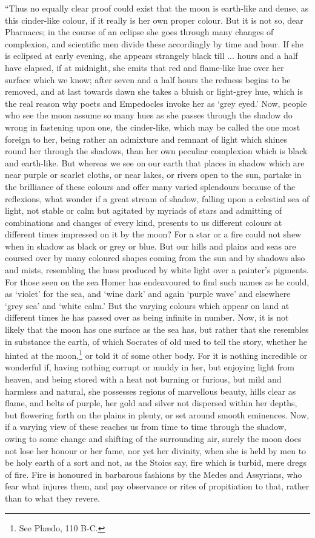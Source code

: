\documentclass[a4paper, 11pt, oneside, polutonikogreek, english]{article}
\begin{document}
``Thus no equally clear proof could exist that the moon is earth-like and dense, as this cinder-like colour, if it really is her own proper colour. But it is not so, dear Pharnaces; in the course of an eclipse she goes through many changes of complexion, and scientific men divide these accordingly by time and hour. If she is eclipsed at early evening, she appears strangely black till ... hours and a half have elapsed, if at midnight, she emits that red and flame-like hue over her surface which we know; after seven and a half hours the redness begins to be removed, and at last towards dawn she takes a bluish or light-grey hue, which is the real reason why poets and Empedocles invoke her as `grey eyed.' Now, people who see the moon assume so many hues as she passes through the shadow do wrong in fastening upon one, the cinder-like, which may be called the one most foreign to her, being rather an admixture and remnant of light which shines round her through the shadows, than her own peculiar complexion which is black and earth-like. But whereas we see on our earth that places in shadow which are near purple or scarlet cloths, or near lakes, or rivers open to the sun, partake in the brilliance of these colours and offer many varied splendours because of the reflexions, what wonder if a great stream of shadow, falling upon a celestial sea of light, not stable or calm but agitated by myriads of stars and admitting of combinations and changes of every kind, presents to us different colours at different times impressed on it by the moon? For a star or a fire could not shew when in shadow as black or grey or blue. But our hills and plains and seas are coursed over by many coloured shapes coming from the sun and by shadows also and mists, resembling the hues produced by white light over a painter's pigments. For those seen on the sea Homer has endeavoured to find such names as he could, as `violet' for the sea, and `wine dark' and again `purple wave' and elsewhere `grey sea' and `white calm.' But the varying colours which appear on land at different times he has passed over as being infinite in number. Now, it is not likely that the moon has one surface as the sea has, but rather that she resembles in substance the earth, of which Socrates of old used to tell the story, whether he hinted at the moon,\footnote{See Phædo, 110 B-C.} or told it of some other body. For it is nothing incredible or wonderful if, having nothing corrupt or muddy in her, but enjoying light from heaven, and being stored with a heat not burning or furious, but mild and harmless and natural, she possesses regions of marvellous beauty, hills clear as flame, and belts of purple, her gold and silver not dispersed within her depths, but flowering forth on the plains in plenty, or set around smooth eminences. Now, if a varying view of these reaches us from time to time through the shadow, owing to some change and shifting of the surrounding air, surely the moon does not lose her honour or her fame, nor yet her divinity, when she is held by men to be holy earth of a sort and not, as the Stoics say, fire which is turbid, mere dregs of fire. Fire is honoured in barbarous fashions by the Medes and Assyrians, who fear what injures them, and pay observance or rites of propitiation to that, rather than to what they revere. 
\end{document}
